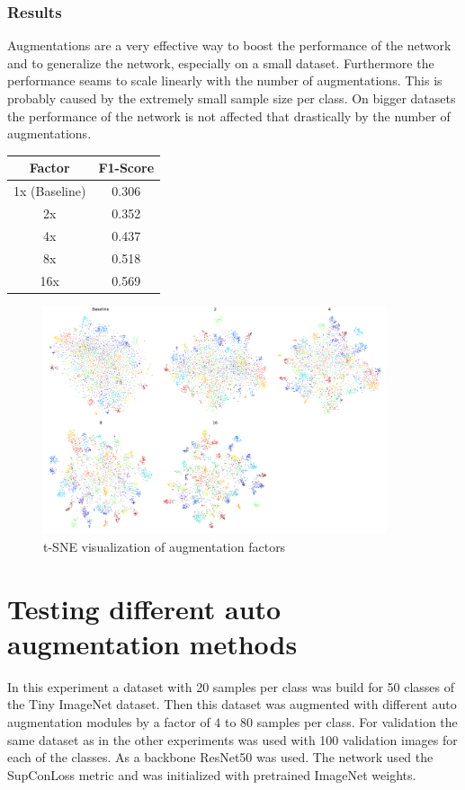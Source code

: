 \documentclass[12pt,a4paper]{report}
\newcommand{\splitlayout}[2]{
	\begin{minipage}{0.6\textwidth}
		#1
	\end{minipage}
	\hfill
	\begin{minipage}{0.35\textwidth}
		#2
	\end{minipage}	
}
\begin{document}
\subsubsection{Results}
\splitlayout{
	Augmentations are a very effective way to boost the performance of the network and 
	to generalize the network,
	especially on a small dataset.
	Furthermore the performance seams to scale linearly with the number of augmentations.
	This is probably caused by the extremely small sample size per class.
	On bigger datasets the performance of the network is not affected that drastically by the number of augmentations.
}{
	\begin{tabular}{ | c | c | }
		\hline
		Factor &  F1-Score \\ 
		\hline
		1x (Baseline) &  0.306  \\ 
		\hline
		2x & 0.352 \\ 
		\hline
		4x & 0.437 \\ 
		\hline
		8x & 0.518 \\ 
		\hline
		16x & 0.569  \\ 
		\hline
	\end{tabular}
}

\begin{figure}[hb]
	\centering
	\includegraphics[width=0.9\textwidth]{../plots/augmentation_size.png}
	\caption{t-SNE visualization of augmentation factors}
\end{figure}

\newpage

\section{Testing different auto augmentation methods}
In this experiment a dataset with 20 samples per class was build for 50 classes of the Tiny ImageNet dataset.
Then this dataset was augmented with different auto augmentation modules by a factor of 4 to 80 samples per class.
For validation the same dataset as in the other experiments was used with 100 validation images for each of the classes.
As a backbone ResNet50 was used.
The network used the SupConLoss metric and was initialized with pretrained ImageNet weights.
\end{document}
